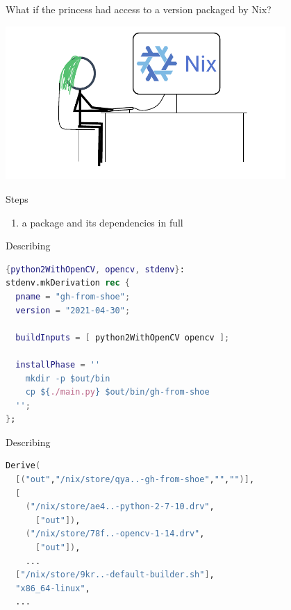 \documentclass[aspectratio=169]{beamer}
\newcommand{\couleur}[2]{{\color{#1}{#2}}}
\begin{document}
\begin{frame}
What if the princess had access to a version packaged by Nix?
\begin{center}
    \includegraphics[width=0.8\textwidth]{img/princess-comics-computer-nix.pdf}
\end{center}
\end{frame}

\begin{frame}
    \begin{block}{Steps}
        \begin{enumerate}
            \item<2-> \couleur{blue-portage}{Describe} a package and its
                dependencies in full
         \end{enumerate}
    \end{block}
\end{frame}

\begin{frame}[fragile]{Describing}
\begin{lstlisting}[language=Nix,title={gh-from-shoe/default.nix}]
{python2WithOpenCV, opencv, stdenv}:
stdenv.mkDerivation rec {
  pname = "gh-from-shoe";
  version = "2021-04-30";

  buildInputs = [ python2WithOpenCV opencv ];

  installPhase = ''
    mkdir -p $out/bin
    cp ${./main.py} $out/bin/gh-from-shoe
  '';
};
\end{lstlisting}
\end{frame}

\begin{frame}[fragile]{Describing}
\begin{lstlisting}[language=Nix,title={gh-from-shoe-1-0.drv (generated)}]
Derive(
  [("out","/nix/store/qya..-gh-from-shoe","","")],
  [
    ("/nix/store/ae4..-python-2-7-10.drv",
      ["out"]),
    ("/nix/store/78f..-opencv-1-14.drv",
      ["out"]),
    ...
  ["/nix/store/9kr..-default-builder.sh"],
  "x86_64-linux",
  ...
\end{lstlisting}
\end{frame}
\end{document}
